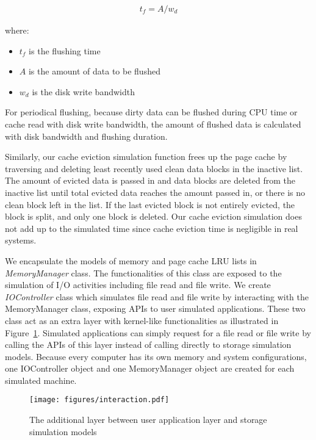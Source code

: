 \documentclass[conference]{IEEEtran}
\begin{document}
			\begin{align*}
				t_f = A / w_d
			\end{align*}		
			
			where:
			\begin{itemize}
				\item $t_f$ is the flushing time
				\item $A$ is the amount of data to be flushed
				\item $w_d$ is the disk write bandwidth
			\end{itemize}		
			
			For periodical flushing, because dirty data can be flushed during CPU time 
			or cache read with disk write bandwidth, the amount of flushed data is 
			calculated with disk bandwidth and flushing duration.
				
			Similarly, our cache eviction simulation function frees up the page cache 
			by traversing and deleting least recently used clean data blocks 
			in the inactive list.
			The amount of evicted data is passed in and data blocks are deleted 
			from the inactive list until total evicted data reaches the amount 
			passed in, or there is no clean block left in the list.
			If the last evicted block is not entirely evicted, the block is split, 
			and only one block is deleted.
			Our cache eviction simulation does not add up to the simulated time 
			since cache eviction time is negligible in real systems.			
			
			We encapsulate the models of memory and page cache LRU lists in 
			\textit{MemoryManager} class. 
			The functionalities of this class are exposed to the simulation  
			of I/O activities including file read and file write. 
			We create \textit{IOController} class which simulates file read and 
			file write by interacting with the MemoryManager class, 
			exposing APIs to user simulated applications. 
			These two class act as an extra layer with kernel-like functionalities as 
			illustrated in Figure~\ref{fig:interaction}. 
			Simulated applications can simply request for a file read 
			or file write by calling the APIs of this layer instead of 
			calling directly to storage simulation models.
			Because every computer has its own memory and system configurations, 
			one IOController object and one MemoryManager object are created 
			for each simulated machine.
			
			\begin{figure}
   				\centering
   				\texttt{[image: figures/interaction.pdf]}
   				\caption{The additional layer between user application layer and 
   				storage simulation models}\label{fig:interaction}
			\end{figure}				
\end{document}
